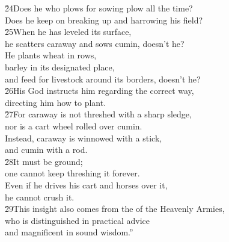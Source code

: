 \begin{poetry}
\poeml \v{24}Does he who plows for sowing plow all the time? \\
\poemll    Does he keep on breaking up and harrowing his field? \\
\poeml \v{25}When he has leveled its surface, \\
\poemll    he scatters caraway and sows cumin, doesn't he? \\
\poeml He plants wheat in rows, \\
\poemll    barley in its designated place, \\
\poeml and feed for livestock around its borders, doesn't he? \\
\poeml \v{26}His God instructs him regarding the correct way, \\
\poemll    directing him how to plant. \\
\poeml \v{27}For caraway is not threshed with a sharp sledge, \\
\poemll    nor is a cart wheel rolled over cumin. \\
\poeml Instead, caraway is winnowed with a stick, \\
\poemll    and cumin with a rod. \\
\poeml \v{28}It must be ground; \\
\poemll    one cannot keep threshing it forever. \\
\poeml Even if he drives his cart and horses over it, \\
\poemll    he cannot crush it. \\
\poeml \v{29}This insight also comes from the  of the Heavenly Armies, \\
\poemll    who is distinguished in practical advice \\
\poemlll       and magnificent in sound wisdom.''
\end{poetry}

